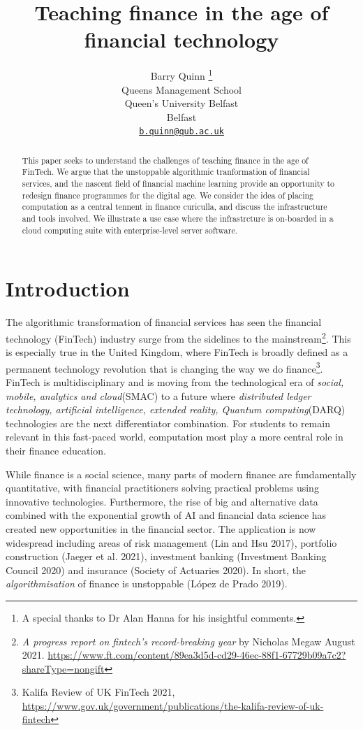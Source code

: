 \documentclass{article}
\title{Teaching finance in the age of financial technology}
\author{
    Barry Quinn
    \thanks{A special thanks to Dr Alan Hanna for his insightful comments.}
   \\
    Queens Management School \\
    Queen's University Belfast \\
  Belfast \\
  \texttt{\href{mailto:b.quinn@qub.ac.uk}{\nolinkurl{b.quinn@qub.ac.uk}}} \\
  }
\begin{document}
\maketitle

\def\tightlist{}


\begin{abstract}
This paper seeks to understand the challenges of teaching finance in the
age of FinTech. We argue that the unstoppable algorithmic tranformation
of financial services, and the nascent field of financial machine
learning provide an opportunity to redesign finance programmes for the
digital age. We consider the idea of placing computation as a central
tennent in finance curiculla, and discuss the infrastructure and tools
involved. We illustrate a use case where the infrastrcture is on-boarded
in a cloud computing suite with enterprise-level server software.
\end{abstract}


\hypertarget{introduction}{%
\section{Introduction}\label{introduction}}

The algorithmic transformation of financial services has seen the
financial technology (FinTech) industry surge from the sidelines to the
mainstream\footnote{\emph{A progress report on fintech's record-breaking
  year} by Nicholas Megaw August 2021.
  \url{https://www.ft.com/content/89ea3d5d-cd29-46ec-88f1-67729b09a7c2?shareType=nongift}}.
This is especially true in the United Kingdom, where FinTech is broadly
defined as a permanent technology revolution that is changing the way we
do finance\footnote{Kalifa Review of UK FinTech 2021,
  \url{https://www.gov.uk/government/publications/the-kalifa-review-of-uk-fintech}}.
FinTech is multidisciplinary and is moving from the technological era of
\emph{social, mobile, analytics and cloud}(SMAC) to a future where
\emph{distributed ledger technology, artificial intelligence, extended
reality, Quantum computing}(DARQ) technologies are the next
differentiator combination. For students to remain relevant in this
fast-paced world, computation most play a more central role in their
finance education.

While finance is a social science, many parts of modern finance are
fundamentally quantitative, with financial practitioners solving
practical problems using innovative technologies. Furthermore, the rise
of big and alternative data combined with the exponential growth of AI
and financial data science has created new opportunities in the
financial sector. The application is now widespread including areas of
risk management (Lin and Hsu 2017), portfolio construction (Jaeger et
al. 2021), investment banking (Investment Banking Council 2020) and
insurance (Society of Actuaries 2020). In short, the
\emph{algorithmisation} of finance is unstoppable (López de Prado 2019).
\end{document}
